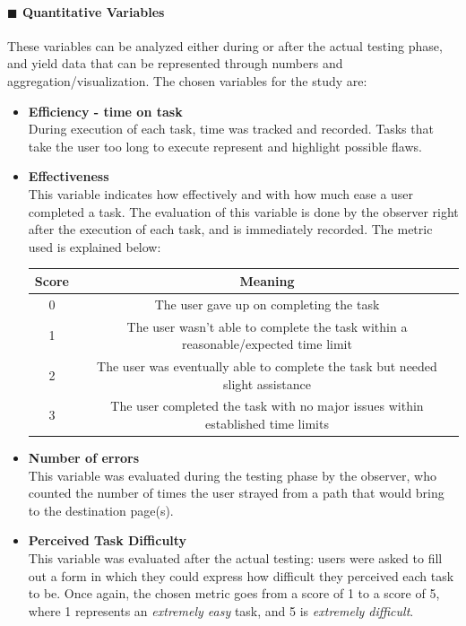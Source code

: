 \documentclass[11pt]{article} %
\begin{document}
\paragraph{$\blacksquare$ Quantitative Variables}
These variables can be analyzed either during or after the actual testing phase, and yield data that can be represented through numbers and aggregation/visualization. The chosen variables for the study are:
\begin{itemize}
    \item \textbf{Efficiency - time on task}\\
    During execution of each task, time was tracked and recorded. Tasks that take the user too long to execute represent and highlight possible flaws. 
    \item \textbf{Effectiveness}\\
    This variable indicates how effectively and with how much ease a user completed a task. The evaluation of this variable is done by the observer right after the execution of each task, and is immediately recorded. The metric used is explained below:
    \begin{center}
    \begin{tabular}{|c|c|} 
    \hline
    \textbf{Score} & \textbf{Meaning}\\ 
    \hline
    0 & The user gave up on completing the task \\
    \hline
    1 & The user wasn't able to complete the task within a reasonable/expected time limit \\
    \hline
    2 & The user was eventually able to complete the task but needed slight assistance \\
    \hline
    3 & The user completed the task with no major issues within established time limits\\
    \hline
    \end{tabular}
\end{center}
    
    \item \textbf{Number of errors}\\
    This variable was evaluated during the testing phase by the observer, who counted the number of times the user strayed from a path that would bring to the destination page(s).
   
    \item \textbf{Perceived Task Difficulty}\\
    This variable was evaluated after the actual testing: users were asked to fill out a form in which they could express how difficult they perceived each task to be. Once again, the chosen metric goes from a score of 1 to a score of 5, where 1 represents an \textit{extremely easy} task, and 5 is \textit{extremely difficult}.
    
\end{itemize}
\end{document}

